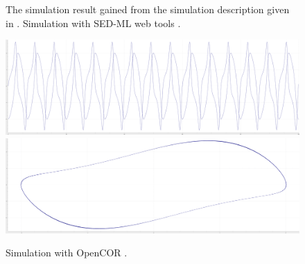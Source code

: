 \begin{figure}[ht]
\begin{minipage}{0.47\textwidth}
        \caption{The simulation result gained from the simulation description given in . Simulation with SED-ML web tools \citep{bergmann2017sed}.}
    \end{minipage}\hfill
    \begin{minipage}{0.5\textwidth}
        \centering
        \includegraphics[width=1.0\textwidth]{examples/vanderpol-cellml/results/opencor/plot1}
        \includegraphics[width=1.0\textwidth]{examples/vanderpol-cellml/results/opencor/plot2}
        \caption{Simulation with OpenCOR \citep{garny2015opencor}.}
    \end{minipage}
    \label{fig:lorenz-cellml}
\end{figure}


